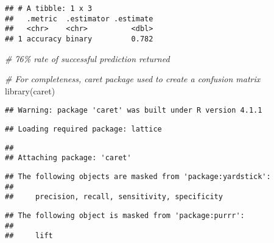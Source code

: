 \documentclass[
]{article}
\newenvironment{Shaded}{\begin{snugshade}}{\end{snugshade}}
\newcommand{\CommentTok}[1]{\textcolor[rgb]{0.56,0.35,0.01}{\textit{#1}}}
\newcommand{\FunctionTok}[1]{\textcolor[rgb]{0.00,0.00,0.00}{#1}}
\newcommand{\NormalTok}[1]{#1}
\newcommand{\SpecialCharTok}[1]{\textcolor[rgb]{0.00,0.00,0.00}{#1}}
\begin{document}
\begin{verbatim}
## # A tibble: 1 x 3
##   .metric  .estimator .estimate
##   <chr>    <chr>          <dbl>
## 1 accuracy binary         0.782
\end{verbatim}

\begin{Shaded}
\begin{Highlighting}[]
\CommentTok{\# 76\% rate of successful prediction returned}
\end{Highlighting}
\end{Shaded}

\begin{Shaded}
\begin{Highlighting}[]
\CommentTok{\# For completeness,  caret package used to create a confusion matrix}
\FunctionTok{library}\NormalTok{(caret)}
\end{Highlighting}
\end{Shaded}

\begin{verbatim}
## Warning: package 'caret' was built under R version 4.1.1
\end{verbatim}

\begin{verbatim}
## Loading required package: lattice
\end{verbatim}

\begin{verbatim}
## 
## Attaching package: 'caret'
\end{verbatim}

\begin{verbatim}
## The following objects are masked from 'package:yardstick':
## 
##     precision, recall, sensitivity, specificity
\end{verbatim}

\begin{verbatim}
## The following object is masked from 'package:purrr':
## 
##     lift
\end{verbatim}

\begin{Shaded}
\end{Shaded}
\end{document}
